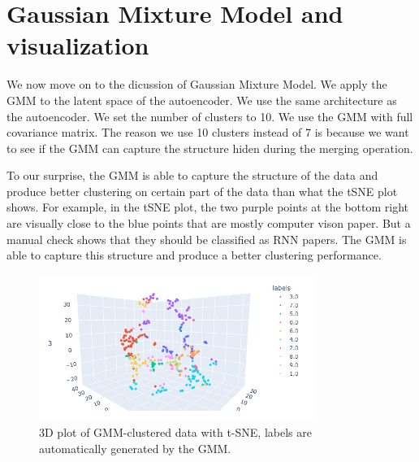 \documentclass{article}
\begin{document}
\newpage
\section*{Gaussian Mixture Model and visualization}
We now move on to the dicussion of Gaussian Mixture Model. We apply the GMM to the latent space of the autoencoder. We use the same architecture as the autoencoder. We set the number of clusters to 10. We use the GMM with full covariance matrix. The reason we use 10 clusters instead of 7 is because we want to see if the GMM can capture the structure hiden during the merging operation.

To our surprise, the GMM is able to capture the structure of the data and produce better clustering on certain part of the data than what the tSNE plot shows. For example, in the tSNE plot, the two purple points at the bottom right are visually close to the blue points that are mostly computer vison paper. But a manual check shows that they should be classified as RNN papers. The GMM is able to capture this structure and produce a better clustering performance.

\begin{figure}[h!]
\centering
\includegraphics[width=0.8\textwidth]{figs/tsne4.png}
\caption{3D plot of GMM-clustered data with t-SNE, labels are automatically generated by the GMM.}
\end{figure}
\end{document}
